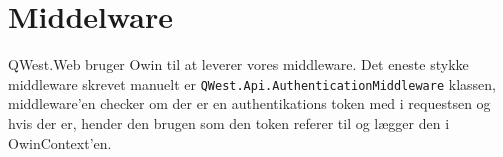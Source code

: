 
\chapter{Middelware}\label{ch:middleware}

QWest.Web bruger Owin \cite{Owin} til at leverer vores middleware. Det eneste stykke middleware skrevet manuelt er \texttt{QWest.Api.AuthenticationMiddleware} klassen, middleware'en checker om der er en authentikations token med i requestsen og hvis der er, hender den brugen som den token referer til og lægger den i OwinContext'en. 